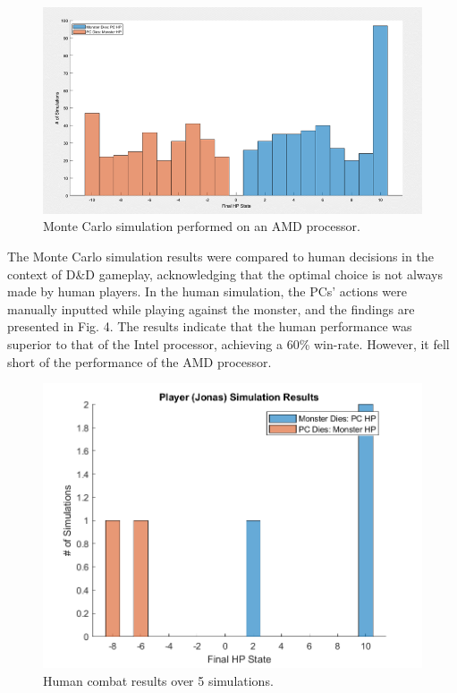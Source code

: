 \documentclass[letterpaper, 10 pt, conference]{ieeeconf}
\begin{document}
\begin{figure}[thb]
    \centering
    \includegraphics[width=\columnwidth]{figs/DND_MChist_AMD.png}
    \caption{Monte Carlo simulation performed on an AMD processor.}
\end{figure}

The Monte Carlo simulation results were compared to human decisions in the context of D\&D gameplay, acknowledging that the optimal choice is 
not always made by human players. In the human simulation, the PCs' actions were manually inputted while playing against the monster, and the 
findings are presented in Fig. 4. The results indicate that the human performance was superior to that of the Intel processor, 
achieving a 60\% win-rate. However, it fell short of the performance of the AMD processor.

\begin{figure}[thb]
    \centering
    \includegraphics[scale = 0.5]{figs/DND_player_jonas_hist.png}
    \caption{Human combat results over 5 simulations.}
\end{figure}
\end{document}

